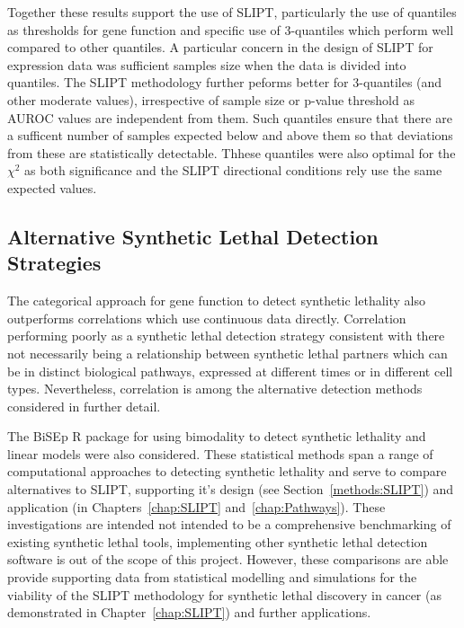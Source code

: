 Together these results support the use of \gls{SLIPT}, particularly the use of quantiles as thresholds for gene function and specific use of 3-quantiles which perform well compared to other quantiles. A particular concern in the design of \gls{SLIPT} for expression data was sufficient samples size when the data is divided into quantiles. The \gls{SLIPT} methodology further peforms better for 3-quantiles (and other moderate values), irrespective of sample size or p-value threshold as \gls{AUROC} values are independent from them. Such quantiles ensure that there are a sufficent number of samples expected below and above them so that deviations from these are statistically detectable. Thhese quantiles were also optimal for the $\chi^2$ as both significance and the \gls{SLIPT} directional conditions rely use the same expected values.

\FloatBarrier

\subsection{Alternative Synthetic Lethal Detection Strategies}

The categorical approach for gene function to detect synthetic lethality also outperforms correlations which use continuous data directly. Correlation performing poorly as a synthetic lethal detection strategy consistent with there not necessarily being a relationship between synthetic lethal partners which can be in distinct biological pathways, expressed at different times or in different cell types. Nevertheless, correlation is among the alternative detection methods considered in further detail.

The \gls{BiSEp} R package \citep{Wappett2014} for using bimodality to detect synthetic lethality \citep{Wappett2016} and linear models were also considered. These statistical methods span a range of computational approaches to detecting synthetic lethality and serve to compare alternatives to \gls{SLIPT}, supporting it's design (see Section~\ref{methods:SLIPT}) and application (in Chapters~\ref{chap:SLIPT} and~\ref{chap:Pathways}). These investigations are intended not intended to be a comprehensive benchmarking of existing synthetic lethal tools, implementing other synthetic lethal detection software is out of the scope of this project. However, these comparisons are able provide supporting data from statistical modelling and simulations for the viability of the \gls{SLIPT} methodology for synthetic lethal discovery in cancer (as demonstrated in Chapter~\ref{chap:SLIPT}) and further applications.

